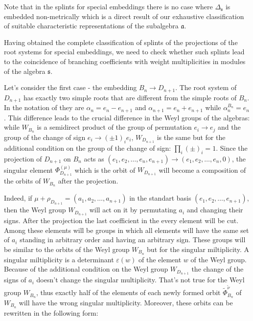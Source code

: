 \documentclass[12pt]{article}
\newcommand{\af}{\mathfrak{a}}
\newcommand{\sfr}{\mathfrak{s}}
\begin{document}
Note that in the splints for special embeddings there is no case where $\Delta_{\sfr}$ is embedded
non-metrically which is a direct result of our exhaustive classification of suitable characteristic
representations of the subalgebra $\af$.


Having obtained the complete classification of splints of the projections of
the root systems for special embeddings, we need to check whether such splints lead
to the coincidence of branching coefficients with weight multiplicities in modules of
the algebra $\sfr$.

Let's consider the first case - the embedding $B_{n}\to D_{n+1}$. The root system of $D_{n+1}$ has
exactly two simple roots that are different from the simple roots of $B_{n}$. In the notation of
\cite{bourbaki2002lie} they are $\alpha_{n}=e_n-e_{n+1}$ and $\alpha_{n+1}=e_n+e_{n+1}$ while
$\alpha_n^{B_n}=e_n$. This difference leads to the crucial difference in the Weyl groups of the
algebras: while $W_{B_{n}}$ is a semidirect product of the group of permutation $e_{i} \to e_{j}$
and the group of the change of sign $e_{i}\to (\pm 1)_{i}e_{i}$, $W_{D_{n+1}}$ is the same but for
the additional condition on the group of the change of sign: $\prod_{i} (\pm)_{i}=1.$ Since the
projection of $D_{n+1}$ on $B_{n}$ acts as
$(e_1,e_2,\dots,e_{n},e_{n+1})\to(e_1,e_2,\dots,e_{n},0)$, the singular element
$\Phi^{(\mu)}_{D_{n+1}}$ which is the orbit of $W_{D_{n+1}}$ will become a composition of the orbits
of $W_{B_{n}}$ after the projection.

Indeed, if $\mu+\rho_{D_{n+1}}=(a_1,a_2,\dots,a_{n+1})$ in the standart basis
$(e_1,e_2,\dots,e_{n+1})$, then the Weyl group $W_{D_{n+1}}$ will act on it by permutating $a_i$ and
changing their signs. After the projection the last coefficient in the every element will be cut. Among
these elements will be groups in which all elements will have the same set of $a_i$ standing in
arbitrary order and having an arbitrary sign. These groups will be similar to the orbits of the Weyl
group $W_{B_{n}}$ but for the singular miltiplicity. A singular miltiplicity is a determinant
$\varepsilon (w)$ of the element $w$ of the Weyl group. Because of the additional condition on the
Weyl group $W_{D_{n+1}}$ the change of the signs of $a_i$ doesn't change the singular multiplicity.
That's not true for the Weyl group $W_{B_{n}}$, thus exactly half of the elements of each newly
formed orbit $\tilde\Phi^{\tilde\nu}_{B_n}$ of $W_{B_{n}}$ will have the wrong singular
multiplicity. Moreover, these orbits can be rewritten in the following form:
\end{document}
